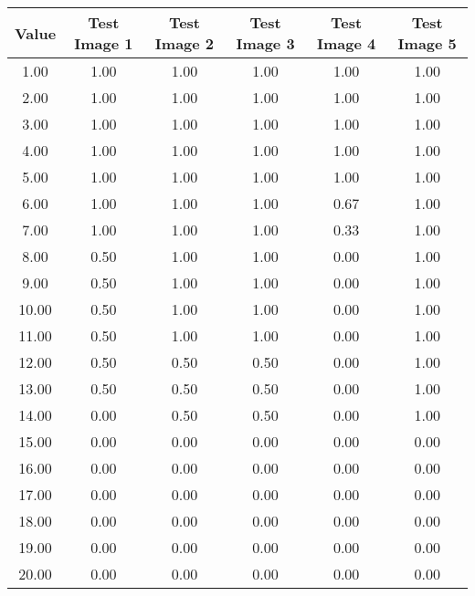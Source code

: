 \begin{tabular}{|c|c|c|c|c|c|}
\hline
\textbf{Value}&\textbf{Test Image 1}&\textbf{Test Image 2}&\textbf{Test Image 3}&\textbf{Test Image 4}&\textbf{Test Image 5}\\\hline
1.00&1.00&1.00&1.00&1.00&1.00\\\hline
2.00&1.00&1.00&1.00&1.00&1.00\\\hline
3.00&1.00&1.00&1.00&1.00&1.00\\\hline
4.00&1.00&1.00&1.00&1.00&1.00\\\hline
5.00&1.00&1.00&1.00&1.00&1.00\\\hline
6.00&1.00&1.00&1.00&0.67&1.00\\\hline
7.00&1.00&1.00&1.00&0.33&1.00\\\hline
8.00&0.50&1.00&1.00&0.00&1.00\\\hline
9.00&0.50&1.00&1.00&0.00&1.00\\\hline
10.00&0.50&1.00&1.00&0.00&1.00\\\hline
11.00&0.50&1.00&1.00&0.00&1.00\\\hline
12.00&0.50&0.50&0.50&0.00&1.00\\\hline
13.00&0.50&0.50&0.50&0.00&1.00\\\hline
14.00&0.00&0.50&0.50&0.00&1.00\\\hline
15.00&0.00&0.00&0.00&0.00&0.00\\\hline
16.00&0.00&0.00&0.00&0.00&0.00\\\hline
17.00&0.00&0.00&0.00&0.00&0.00\\\hline
18.00&0.00&0.00&0.00&0.00&0.00\\\hline
19.00&0.00&0.00&0.00&0.00&0.00\\\hline
20.00&0.00&0.00&0.00&0.00&0.00\\\hline
\end{tabular}
